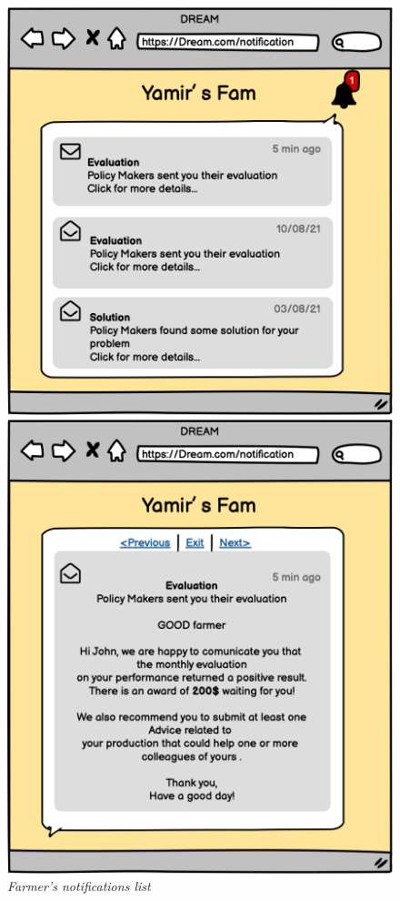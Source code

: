 \begin{figure}[ht!]
    \begin{minipage}{0.5\textwidth}
        \centering
        \includegraphics[width=1\textwidth]{mockups/FNotifications.png}
        \caption{\emph{Farmer's notifications list}}
        \label{fig:notificationList}
    \end{minipage}\hfill
    \begin{minipage}{0.47\textwidth}
        \centering
        \includegraphics[width=1\textwidth]{mockups/FNotification.png}

\end{minipage}
\end{figure}
